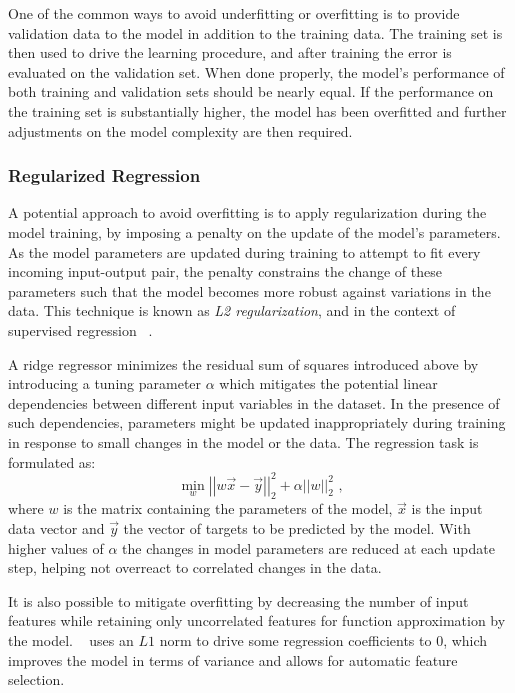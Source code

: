 One of the common ways to avoid underfitting or overfitting is to provide validation data to the model in addition to the training data.
The training set is then used to drive the learning procedure, and after training the error is evaluated on the validation set.
When done properly, the model's performance of both training and validation sets should be nearly equal.
If the performance on the training set is substantially higher, the model has been overfitted and further adjustments on the model complexity are then required.

\subsubsection*{Regularized Regression}

A potential approach to avoid overfitting is to apply regularization during the model training, by imposing a penalty on the update of the model's parameters.
As the model parameters are updated during training to attempt to fit every incoming input-output pair, the penalty constrains the change of these parameters such that the model becomes more robust against variations in the data.
This technique is known as \textit{L2 regularization}, and in the context of supervised regression ~\cite{MIT:Rifkin:Regularized_Least_Squares}.

A ridge regressor minimizes the residual sum of squares introduced above by introducing a tuning parameter \(\alpha\) which mitigates the potential linear dependencies between different input variables in the dataset.
In the presence of such dependencies, parameters might be updated inappropriately during training in response to small changes in the model or the data.
The regression task is formulated as:
\begin{equation}
    \min _w \left|\left| w \vec{x} - \vec{y} \right|\right|_2^2 + \alpha \left|\left| w \right|\right|_2^2 \text{ ,}
    \label{equation:ridge_regression_regularization}
\end{equation}
where \(w\) is the matrix containing the parameters of the model, \(\vec{x}\) is the input data vector and \(\vec{y}\) the vector of targets to be predicted by the model.
With higher values of \(\alpha\) the changes in model parameters are reduced at each update step, helping not overreact to correlated changes in the data.

It is also possible to mitigate overfitting by decreasing the number of input features while retaining only uncorrelated features for function approximation by the model.
~\cite{JRSS:Tibshirani:Regression_Shrinkage_Selection_Via_Lasso} uses an \(L1\) norm to drive some regression coefficients to \(0\), which improves the model in terms of variance and allows for automatic feature selection.

